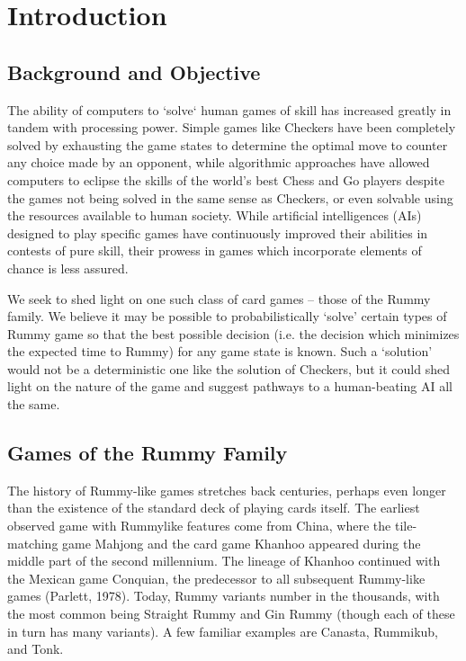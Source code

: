 \documentclass[letter,12pt]{article}
\begin{document}
\section{Introduction}

\subsection{Background and Objective}
The ability of computers to `solve` human games of skill has increased greatly in tandem with processing power. Simple games like Checkers have been completely solved by exhausting the game states to determine the optimal move to counter any choice made by an opponent, while algorithmic approaches have allowed computers to eclipse the skills of the world's best Chess and Go players despite the games not being solved in the same sense as Checkers, or even solvable using the resources available to human society. While artificial intelligences (AIs) designed to play specific games have continuously improved their abilities in contests of pure skill, their prowess in games which incorporate elements of chance is less assured.
 
We seek to shed light on one such class of card games – those of the Rummy family. We believe it may be possible to probabilistically ‘solve’ certain types of Rummy game so that the best possible decision (i.e. the decision which minimizes the expected time to Rummy) for any game state is known. Such a ‘solution’ would not be a deterministic one like the solution of Checkers, but it could shed light on the nature of the game and suggest pathways to a human-beating AI all the same. 
 
\subsection{Games of the Rummy Family}

The history of Rummy-like games stretches back centuries, perhaps even longer than the existence of the standard deck of playing cards itself. The earliest observed game with Rummylike features come from China, where the tile-matching game Mahjong and the card game Khanhoo appeared during the middle part of the second millennium. The lineage of Khanhoo  continued with the Mexican game Conquian, the predecessor to all subsequent Rummy-like games (Parlett, 1978). Today, Rummy variants number in the thousands, with the most common being Straight Rummy and Gin Rummy (though each of these in turn has many variants). A few familiar examples are Canasta, Rummikub, and Tonk. 
\end{document}
